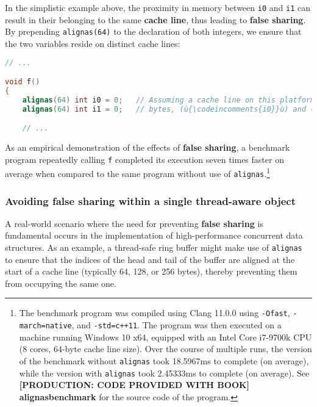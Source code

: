 \noindent In the simplistic example above, the proximity in memory between
\texttt{i0} and \texttt{i1} can result in their belonging to the same
\textbf{cache line}, thus leading to \textbf{false sharing}. By
prepending \texttt{alignas(64)} to the declaration of both integers, we
ensure that the two variables reside on distinct cache lines:

\begin{lstlisting}[language=C++]
// ...

void f()
{
    alignas(64) int i0 = 0;   // Assuming a cache line on this platform is 64
    alignas(64) int i1 = 0;   // bytes, (ù{\codeincomments{i0}}ù) and (ù{\codeincomments{i1}}ù) will be on separate ones.

    // ...
\end{lstlisting}
    
\noindent As an empirical demonstration of the effects of \textbf{false sharing},
a benchmark program repeatedly calling \texttt{f} completed its
execution seven times faster on average when compared to the same
program without use of \texttt{alignas}.{\cprotect\footnote{The benchmark
program was compiled using Clang 11.0.0 using \texttt{-Ofast},
\texttt{-march=native}, and \mbox{\texttt{-std=c++11}}. The program was then
executed on a machine running Windows 10 x64, equipped with an Intel
Core i7-9700k CPU (8 cores, 64-byte cache line size). Over the
course of multiple runs, the version of the benchmark without
\texttt{alignas} took 18.5967ms to complete (on average), while the
version with \texttt{alignas} took 2.45333ms to complete (on average).
  See \textbf{{[PRODUCTION: CODE PROVIDED WITH BOOK] alignasbenchmark}} for the source code of the program.}}

\subsubsection[Avoiding \textbf{false sharing} within a single thread-aware object]{Avoiding \textbf{false sharing} within a single thread-aware object}\label{avoiding-false-sharing-within-a-single-thread-aware-object}

A real-world scenario where the need for preventing \textbf{false
sharing} is fundamental occurs in the implementation of high-performance
concurrent data structures. As an example, a thread-safe ring buffer
might make use of \texttt{alignas} to ensure that the indices of the
head and tail of the buffer are aligned at the start of a cache line
(typically 64, 128, or 256 bytes), thereby preventing them from
occupying the same one.

